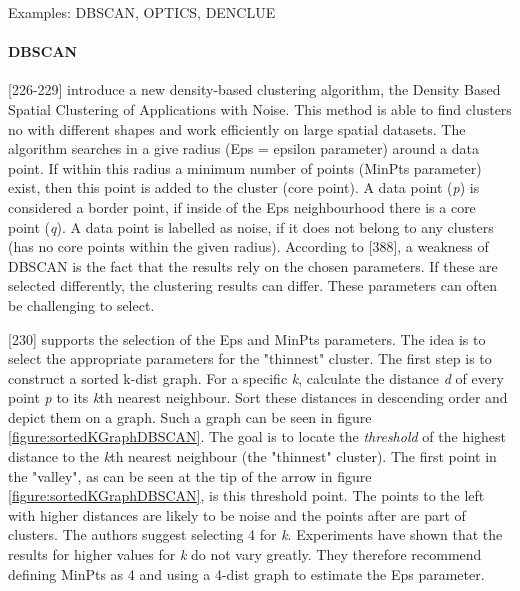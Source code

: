   Examples: DBSCAN, OPTICS, DENCLUE



\paragraph{DBSCAN}
\label{section:DBSCAN}
\textcite{DBSCAN}[226-229] introduce a new density-based clustering algorithm, the Density Based Spatial Clustering of Applications with Noise. This method is able to find clusters no with different shapes and work efficiently on large spatial datasets. The algorithm searches in a give radius (Eps = epsilon parameter) around a data point. If within this radius a minimum number of points (MinPts parameter) exist, then this point is added to the cluster (core point). A data point (\textit{p}) is considered a border point, if inside of the Eps neighbourhood there is a core point (\textit{q}). A data point is labelled as noise, if it does not belong to any clusters (has no core points within the given radius).
According to \textcite{han2011data}[388], a weakness of DBSCAN is the fact that the results rely on the chosen parameters. If these are selected differently, the clustering results can differ. These parameters can often be challenging to select.

\textcite{DBSCAN}[230] supports the selection of the Eps and MinPts parameters. The idea is to select the appropriate parameters for the "thinnest" cluster. The first step is to construct a sorted k-dist graph. For a specific \textit{k}, calculate the distance \textit{d} of every point \textit{p} to its \textit{k}th nearest neighbour. Sort these distances in descending order and depict them on a graph. Such a graph can be seen in figure \ref{figure:sortedKGraphDBSCAN}. The goal is to locate the \textit{threshold} of the highest distance to the \textit{k}th nearest neighbour (the "thinnest" cluster). The first point in the "valley", as can be seen at the tip of the arrow in figure \ref{figure:sortedKGraphDBSCAN}, is this threshold point. The points to the left with higher distances are likely to be noise and the points after are part of clusters. The authors suggest selecting 4 for \textit{k}. Experiments have shown that the results for higher values for \textit{k} do not vary greatly. They therefore recommend defining MinPts as 4 and using a 4-dist graph to estimate the Eps parameter.


